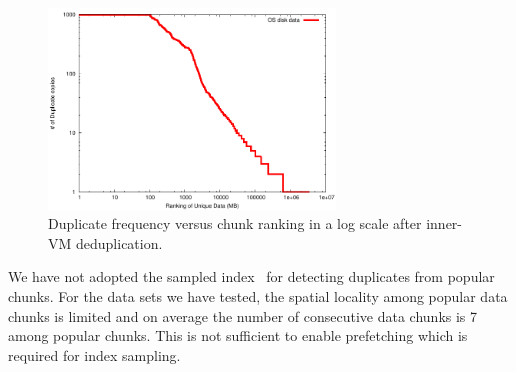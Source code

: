 \begin{figure}
\centering
 \includegraphics[width=3in]{figures/log-log-disk}
\caption{Duplicate frequency versus  chunk ranking in a log scale after inner-VM deduplication.}
\label{fig:Datazipf}
\end{figure}
We have not  adopted the  sampled index~\cite{Guo2011} 
for  detecting duplicates from popular chunks.
For the data sets we have tested, the spatial locality 
among popular
data chunks is limited and  on average the number of consecutive data chunks is 7 among popular chunks.
This is not sufficient to enable prefetching which is required  for index sampling.

